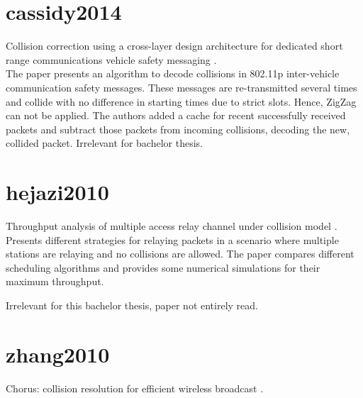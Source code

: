 
\section{cassidy2014}

Collision correction using a cross-layer design architecture for dedicated short range communications vehicle safety messaging \cite{cassidy2014}.\\

The paper presents an algorithm to decode collisions in 802.11p inter-vehicle communication safety messages. These messages are re-transmitted several times and collide with no difference in starting times due to strict slots. Hence, ZigZag can not be applied. The authors added a cache for recent successfully received packets and subtract those packets from incoming collisions, decoding the new, collided packet. Irrelevant for bachelor thesis.



\section{hejazi2010}

Throughput analysis of multiple access relay channel under collision model \cite{hejazi2010}.\\

Presents different strategies for relaying packets in a scenario where multiple stations are relaying and no collisions are allowed. The paper compares different scheduling algorithms and provides some numerical simulations for their maximum throughput.

Irrelevant for this bachelor thesis, paper not entirely read.



\section{zhang2010}

Chorus: collision resolution for efficient wireless broadcast \cite{zhang2010}.\\

